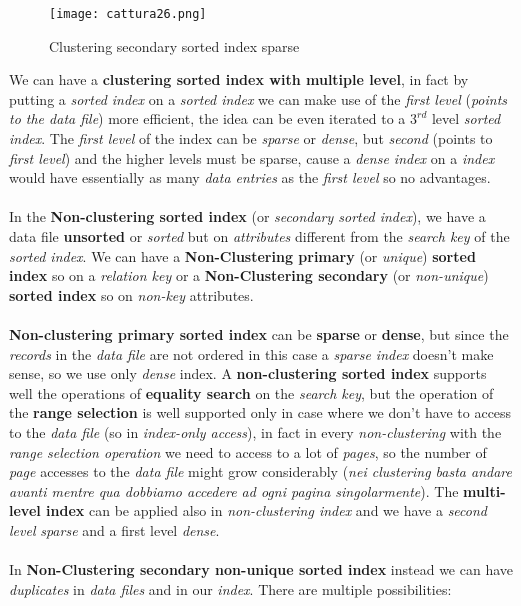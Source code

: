 \documentclass{article}
\begin{document}
\begin{figure}[H]
  \centering
  \texttt{[image: cattura26.png]}
  \caption{Clustering secondary sorted index sparse}
\end{figure}
We can have a \textbf{clustering sorted index with multiple level}, in fact by putting a \emph{sorted index} on a \emph{sorted index} we can make use of the \emph{first level} (\emph{points to the data file}) more efficient, the idea can be even iterated to a $3^{rd}$ level \emph{sorted index}. The \emph{first level} of the index can be \emph{sparse} or \emph{dense}, but \emph{second} (points to \emph{first level}) and the higher levels must be sparse, cause a \emph{dense index} on a \emph{index} would have essentially as many \emph{data entries} as the \emph{first level }so no advantages. \\\\
In the \textbf{Non-clustering sorted index} (or \emph{secondary sorted index}), we have a data file \textbf{unsorted} or \emph{sorted} but on \emph{attributes} different from the \emph{search key} of the \emph{sorted index}. We can have a \textbf{Non-Clustering primary} (or \emph{unique}) \textbf{sorted index} so on a \emph{relation key} or a \textbf{Non-Clustering secondary} (or \emph{non-unique}) \textbf{sorted index} so on \emph{non-key} attributes. \\\\
\textbf{Non-clustering primary sorted index} can be \textbf{sparse} or \textbf{dense}, but since the \emph{records} in the \emph{data file} are not ordered in this case a \emph{sparse index} doesn't make sense, so we use only \emph{dense} index. A \textbf{non-clustering sorted index} supports well the operations of \textbf{equality search} on the \emph{search key}, but the operation of the \textbf{range selection} is well supported only in case where we don't have to access to the \emph{data file} (so in \emph{index-only access}), in fact in every\emph{ non-clustering} with the \emph{range selection operation} we need to access to a lot of \emph{pages}, so the number of \emph{page} accesses to the \emph{data file} might grow considerably (\emph{nei clustering basta andare avanti mentre qua dobbiamo accedere ad ogni pagina singolarmente}). The \textbf{multi-level index} can be applied also in \emph{non-clustering index} and we have a \emph{second level} \emph{sparse} and a first level \emph{dense}.\\\\
In \textbf{Non-Clustering secondary non-unique sorted index} instead we can have \emph{duplicates} in \emph{data files} and in our \emph{index}. There are multiple possibilities:
\end{document}
